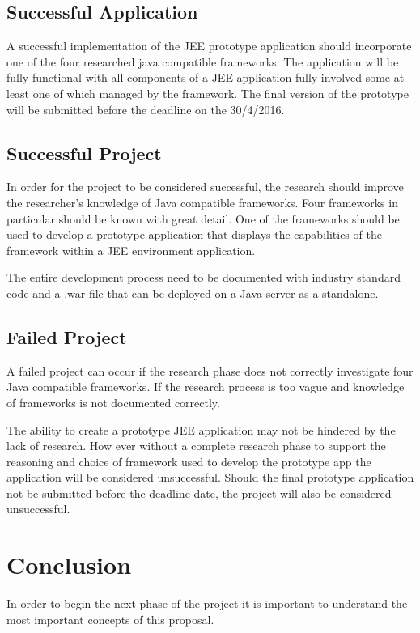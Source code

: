 \subsection{Successful Application}
A successful implementation of the JEE prototype application should incorporate one of the four researched java compatible frameworks. The application will be fully functional with all components of a JEE application fully involved some at least one of which managed by the framework. The final version of the prototype will be submitted before the deadline on the 30/4/2016.

\subsection{Successful Project}
In order for the project to be considered successful, the research should improve the researcher's knowledge of Java compatible frameworks. Four frameworks in particular should be known with great detail. One of the frameworks should be used to develop a prototype application that displays the capabilities of the framework within a JEE environment application.

The entire development process need to be documented with industry standard code and a .war file that can be deployed on a Java server as a standalone.

\subsection{Failed Project}	
A failed project can occur if the research phase does not correctly investigate four Java compatible frameworks. If the research process is too vague and knowledge of frameworks is not documented correctly. 

The ability to create a prototype JEE application may not be hindered by the lack of research. How ever without a complete research phase to support the reasoning and choice of framework used to develop the prototype app the application will be considered unsuccessful. Should the final prototype application not be submitted before the deadline date, the project will also be considered unsuccessful. 

\newpage

\section{Conclusion}
In order to begin the next phase of the project it is important to understand the most important concepts of this proposal.


